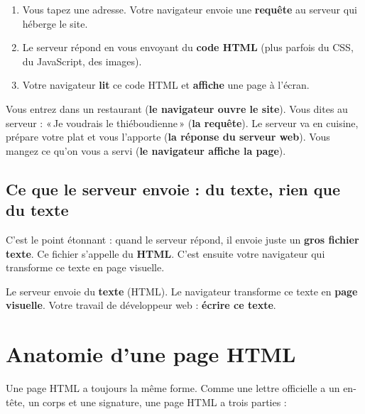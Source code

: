 \documentclass[11pt,a4paper]{article}
\begin{document}
\begin{enumerate}[leftmargin=*,nosep]
    \item Vous tapez une adresse. Votre navigateur envoie une \textbf{requête} au serveur qui héberge le site.
    \item Le serveur répond en vous envoyant du \textbf{code HTML} (plus parfois du CSS, du JavaScript, des images).
    \item Votre navigateur \textbf{lit} ce code HTML et \textbf{affiche} une page à l'écran.
\end{enumerate}

\begin{infobox}
Vous entrez dans un restaurant (\textbf{le navigateur ouvre le site}).
Vous dites au serveur : «\,Je voudrais le thiéboudienne\,» (\textbf{la requête}).
Le serveur va en cuisine, prépare votre plat et vous l'apporte (\textbf{la réponse du serveur web}).
Vous mangez ce qu'on vous a servi (\textbf{le navigateur affiche la page}).
\end{infobox}

\subsection{Ce que le serveur envoie : du texte, rien que du texte}

C'est le point étonnant : quand le serveur répond, il envoie juste un
\textbf{gros fichier texte}. Ce fichier s'appelle du \textbf{HTML}. C'est
ensuite votre navigateur qui transforme ce texte en page visuelle.

\begin{retenirbox}[À retenir]
Le serveur envoie du \textbf{texte} (HTML). Le navigateur transforme ce
texte en \textbf{page visuelle}. Votre travail de développeur web :
\textbf{écrire ce texte}.
\end{retenirbox}

\newpage

\section{Anatomie d'une page HTML}

Une page HTML a toujours la même forme. Comme une lettre officielle a un
en-tête, un corps et une signature, une page HTML a trois parties :
\end{document}
